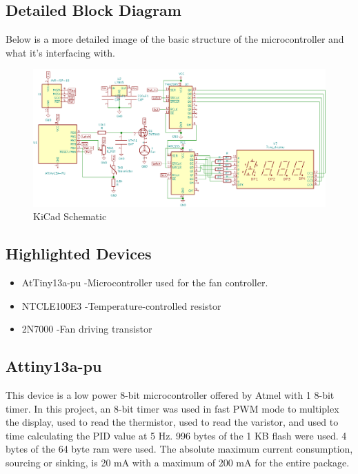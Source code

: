 \documentclass{hitec}
\begin{document}
\subsection{Detailed Block Diagram}
Below is a more detailed image of the basic structure of the microcontroller and what it's interfacing with. 
\begin{figure}[H]
\centering
\includegraphics[width=\textwidth]{schem.png}
\caption{KiCad Schematic}
\label{fig:KiCadSchem}
\end{figure}
\subsection{Highlighted Devices}

\begin{itemize}
\item AtTiny13a-pu		-Microcontroller used for the fan controller.
\item NTCLE100E3		-Temperature-controlled resistor
\item 2N7000			-Fan driving transistor
\end{itemize}

\subsection{Attiny13a-pu}

This device is a low power 8-bit microcontroller offered by Atmel with 1 8-bit timer. In this project, an 8-bit timer was used in fast PWM mode to multiplex the display, used to read the thermistor, used to read the varistor, and used to time calculating the PID value at 5 Hz. 996 bytes of the 1 KB flash were used. 4 bytes of the 64 byte ram were used. The absolute maximum current consumption, sourcing or sinking, is 20 mA with a maximum of 200 mA for the entire package. 
\end{document}
